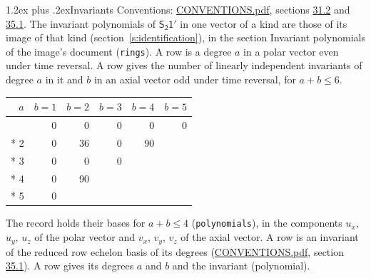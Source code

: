 \documentclass[10pt,a4paper]{article}
\makeatletter
\renewcommand\section{\@startsection{section}{1}{\z@}{-3ex plus -1ex minus -.2ex}%
  {1.2ex plus .2ex}{\normalfont\large\sffamily\bfseries\color{parttitle}}}
\numberwithin{equation}{section}
\newcommand{\grp}[1]{\mathsf{#1}}
\makeatother
\begin{document}
\section{Invariants}\label{s:invariants}
Conventions: \href{../../CONVENTIONS.pdf}{CONVENTIONS.pdf}, sections \href{../../CONVENTIONS.pdf\#conv.31.2}{31.2} and \href{../../CONVENTIONS.pdf\#conv.35.1}{35.1}.
The invariant polynomials of $\grp{S_{2}1'}$ in one vector of a kind are those of its image of that kind (section~\ref{s:identification}), in the section Invariant polynomials of the image's document (\texttt{rings}).
\leavevmode\label{n:index.degree.polar}\label{n:index.degree.axial}A row is a degree $a$ in a polar vector even under time reversal. A row gives the number of linearly independent invariants of degree $a$ in it and $b$ in an axial vector odd under time reversal, for $a + b \le 6$.
{\small\begin{longtable}{@{}rrrrrr@{}}\toprule
$a$ & $b = 1$ & $b = 2$ & $b = 3$ & $b = 4$ & $b = 5$\\\midrule\endhead
\bottomrule\endfoot\endlastfoot
1 & 0 & 0 & 0 & 0 & 0\\*
2 & 0 & 36 & 0 & 90 & \\*
3 & 0 & 0 & 0 &  & \\*
4 & 0 & 90 &  &  & \\*
5 & 0 &  &  &  & \\
\bottomrule\end{longtable}}
\leavevmode\label{n:local.component.polar}\label{n:local.component.axial}The record holds their bases for $a + b \le 4$ (\texttt{polynomials}), in the components $u_{x}$, $u_{y}$, $u_{z}$ of the polar vector and $v_{x}$, $v_{y}$, $v_{z}$ of the axial vector. \label{n:head.polynomial}A row is an invariant of the reduced row echelon basis of its degrees (\href{../../CONVENTIONS.pdf}{CONVENTIONS.pdf}, section \href{../../CONVENTIONS.pdf\#conv.35.1}{35.1}). A row gives its degrees $a$ and $b$ and the invariant (polynomial).
\end{document}
